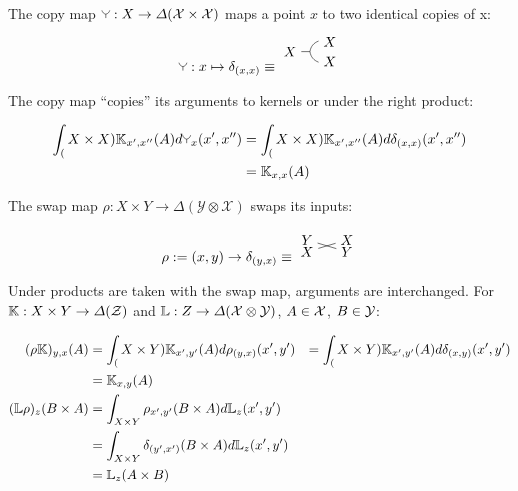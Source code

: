The copy map $\splitter{0.1}:X\to \Delta(\mathcal{X}\times \mathcal{X})$ maps a point $x$ to two identical copies of x:
\begin{align}
 \splitter{0.1}: x\mapsto \delta_{(x,x)} \equiv \begin{tikzpicture}
 \path (0,0) node (X) {$X$} ++ (0.5,0) coordinate (copy0) ++ (0.5,0.25) node (X1) {$X$} ++(0,-0.5) node (X2) {$X$};\draw (X)--(copy0) to [bend left] (X1) (copy0) to [bend right] (X2);
 \end{tikzpicture}\label{eq:copy}
 \end{align} 

The copy map ``copies'' its arguments to kernels or under the right product:

\begin{align}
	\int_(X\times X) \kernel{K}_{x',x''}(A) d\splitter{0.1}_x (x',x'') &= \int_(X\times X) \kernel{K}_{x',x''}(A) d\delta_{(x,x)}(x',x'')\\
															&= \kernel{K}_{x,x}(A)
\end{align}

The swap map $\rho:X\times Y\to \Delta(\mathcal{Y}\otimes\mathcal{X})$ swaps its inputs:

\begin{align}
\rho := (x,y)\to \delta_{(y,x)} \equiv \begin{tikzpicture}
\path (0,0) node (X) {$X$}
+(1,0.3) node (X1) {$X$}
(0,0.3) node (Y) {$Y$}
+(1,-0.3) node (Y1) {$Y$};
\draw (X)--(X1) (Y) -- (Y1);
\end{tikzpicture}\label{eq:swap}
\end{align}

Under products are taken with the swap map, arguments are interchanged. For $\mathbb{K}:X\times Y\to \Delta(\mathcal{Z})$ and $\mathbb{L}:Z\to \Delta(\mathcal{X}\otimes\mathcal{Y})$, $A\in \mathcal{X}$, $B\in\mathcal{Y}$:

\begin{align}
	(\rho\mathbb{K})_{y,x}(A) &= \int_(X\times Y) \mathbb{K}_{x',y'}(A) d\rho_{(y,x)}(x',y') &= \int_(X\times Y) \mathbb{K}_{x',y'}(A) d\delta_{(x,y)}(x',y')\\
													   &= \mathbb{K}_{x,y}(A)\\
	(\mathbb{L}\rho)_{z}(B\times A) &= \int_{X\times Y} \rho_{x',y'}(B\times A) d\mathbb{L}_z(x',y')\\
	&= \int_{X\times Y} \delta_{(y',x')} (B\times A) d\mathbb{L}_z(x',y')\\
	&= \mathbb{L}_z(A\times B)
\end{align}

